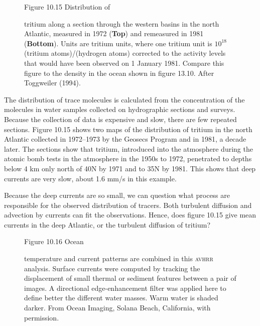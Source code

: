 \begin{figure}[t!]
\footnotesize
Figure 10.15 Distribution of \rule{0pt}{3ex} tritium along a section
through the western basins in the north Atlantic, measured in 1972
(\textbf{Top}) and remeasured in 1981 (\textbf{Bottom}). Units are
tritium units, where one tritium unit is $10^{18}$ (tritium
atoms)/(hydrogen atoms) corrected to the activity levels that would
have been observed on 1 January 1981. Compare this figure to the
density in the ocean shown in figure 13.10. After Toggweiler (1994).
\label{fig:tritium}
\vspace{-5ex}
\end{figure}

The distribution of trace molecules is calculated from the
concentration of the molecules in water samples collected on
hydrographic sections and
surveys. Because the collection of data is expensive and slow, there
are few repeated sections. Figure 10.15 shows two maps of the
distribution of tritium in the north Atlantic collected in 1972--1973
by the Geosecs Program and in 1981, a decade later. The sections show
that tritium, introduced into the atmosphere during the atomic bomb
tests in the atmosphere in the 1950s to 1972, penetrated to depths
below 4 km only north of 40\degrees N by 1971 and to 35\degrees N by
1981. This shows that deep currents are very slow, about 1.6 mm/s in
this example.

Because the deep currents are so small, we can question what process
are responsible for the observed distribution of tracers. Both
turbulent diffusion and advection by currents can fit the
observations. Hence, does figure 10.15 give mean currents in the deep
Atlantic, or the turbulent diffusion of tritium?

\begin{figure}[t!]
\footnotesize
Figure 10.16 Ocean \rule{0mm}{4ex}temperature and current patterns are
combined in this \textsc{avhrr} analysis. Surface currents were computed by
tracking the displacement of small thermal or sediment features
between a pair of images. A directional edge-enhancement filter was
applied here to define better the different water masses. Warm water
is shaded darker. From Ocean Imaging, Solana Beach, California, with
permission.
\label{Fig10.16.bw}
\vspace{-4ex}
\end{figure}

